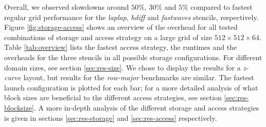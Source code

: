 Overall, we observed slowdowns around $50\%$, $30\%$ and $5\%$ compared to fastest regular grid performance for the \emph{laplap}, \emph{hdiff} and \emph{fastwaves} stencils, respectively. Figure \ref{fig:storage-access} shows an overview of the overhead for all tested combinations of storage and access strategy on a large grid of size $512\times 512\times 64$. Table \ref{tab:overview} lists the fastest access strategy, the runtimes and the overheads for the three stencils in all possible storage configurations. For different domain sizes, see section \ref{sec:res-size}. We chose to display the results for a \emph{z-curve} layout, but results for the \emph{row-major} benchmarks are similar. The fastest launch configuration is plotted for each bar; for a more detailed analysis of what block sizes are beneficial to the different access strategies, see section \ref{sec:res-blocksize}. A more in-depth analysis of the different storage and access strategies is given in sections \ref{sec:res-storage} and \ref{sec:res-access} respectively.